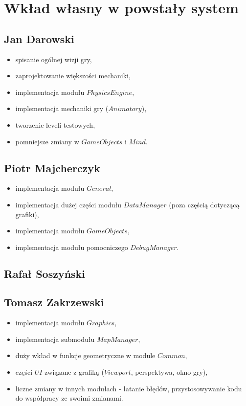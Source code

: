 \documentclass[licencjacka]{pracamgr}
\begin{document}
\chapter{Wkład własny w powstały system}

  \section{Jan Darowski}
  \begin{itemize}
   \item spisanie ogólnej wizji gry,
   \item zaprojektowanie większości mechaniki,
   \item implementacja modułu $PhysicsEngine$,
   \item implementacja mechaniki gry ($Animatory$),
   \item tworzenie leveli testowych,
   \item pomniejsze zmiany w $GameObjects$ i $Mind$.
  \end{itemize}

  \section{Piotr Majcherczyk}
  \begin{itemize}
   \item implementacja modułu $General$,
   \item implementacja dużej części modułu $DataManager$ (poza częścią dotyczącą grafiki),
   \item implementacja modułu $GameObjects$,
   \item implementacja modułu pomocniczego $DebugManager$.
  \end{itemize}

  \section{Rafał Soszyński}

  \section{Tomasz Zakrzewski}
  \begin{itemize}
   \item implementacja modułu $Graphics$,
   \item implementacja submodułu $MapManager$,
   \item duży wkład w funkcje geometryczne w module $Common$,
   \item części $UI$ związane z grafiką ($Viewport$, perspektywa, okno gry),
   \item liczne zmiany w innych modułach - łatanie błędów, przystosowywanie kodu do współpracy ze swoimi zmianami.
  \end{itemize}
\end{document}
